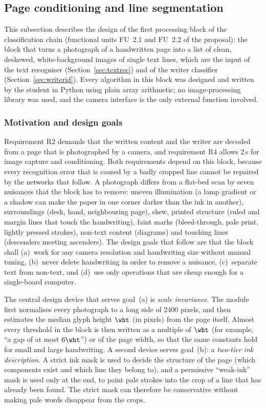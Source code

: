\subsection{Page conditioning and line segmentation}
\label{sec:segmentation}

This subsection describes the design of the first processing block of the classification chain (functional units FU~2.1 and FU~2.2 of the proposal): the block that turns a photograph of a handwritten page into a list of clean, deskewed, white-background images of single text lines, which are the input of the text recogniser (Section~\ref{sec:textrec}) and of the writer classifier (Section~\ref{sec:writerid}).
Every algorithm in this block was designed and written by the student in Python using plain array arithmetic; no image-processing library was used, and the camera interface is the only external function involved.

\subsubsection{Motivation and design goals}

Requirement R2 demands that the written content and the writer are decoded from a page that is photographed by a camera, and requirement R4 allows 2\,s for image capture and conditioning.
Both requirements depend on this block, because every recognition error that is caused by a badly cropped line cannot be repaired by the networks that follow.
A photograph differs from a flat-bed scan by seven nuisances that the block has to remove: uneven illumination (a lamp gradient or a shadow can make the paper in one corner darker than the ink in another), surroundings (desk, hand, neighbouring page), skew, printed structure (ruled and margin lines that touch the handwriting), faint marks (bleed-through, pale print, lightly pressed strokes), non-text content (diagrams) and touching lines (descenders meeting ascenders).
The design goals that follow are that the block shall (a)~work for any camera resolution and handwriting size without manual tuning, (b)~never delete handwriting in order to remove a nuisance, (c)~separate text from non-text, and (d)~use only operations that are cheap enough for a single-board computer.

The central design device that serves goal~(a) is \emph{scale invariance}.
The module first normalises every photograph to a long side of 2400 pixels, and then estimates the median glyph height $\wht$ (in pixels) from the page itself.
Almost every threshold in the block is then written as a multiple of $\wht$ (for example, ``a gap of at most $6\wht$'') or of the page width, so that the same constants hold for small and large handwriting.
A second device serves goal~(b): a \emph{two-tier ink description}.
A strict ink mask is used to decide the structure of the page (which components exist and which line they belong to), and a permissive ``weak-ink'' mask is used only at the end, to paint pale strokes into the crop of a line that has already been found.
The strict mask can therefore be conservative without making pale words disappear from the crops.

